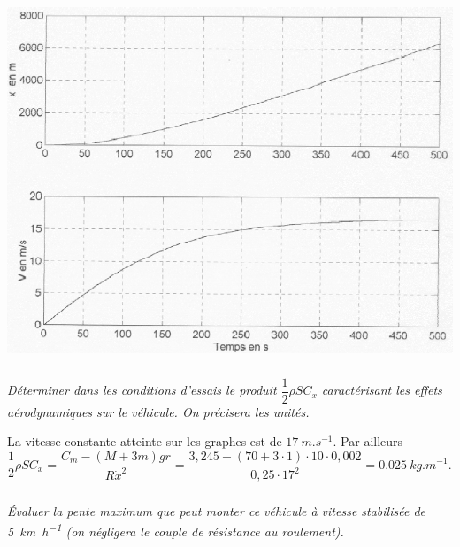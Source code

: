\documentclass[10pt,fleqn]{article} %
\begin{document}
\begin{multicols}{2}
\begin{center}
\includegraphics[width=\linewidth]{images/fig_04}
\end{center}
\fi

\subparagraph{}
\textit{Déterminer dans les conditions d’essais le produit $\dfrac{1}{2}\rho S C_x$ caractérisant les effets aérodynamiques sur le véhicule. On précisera les unités. }
\ifprof
\begin{corrige}
La vitesse constante atteinte sur les graphes est de $\SI{17}{m.s^{-1}}$.  Par ailleurs 
$\dfrac{1}{2}\rho S C_x=\dfrac{C_m-\left(M+3m\right)gr}{R\dot{x}^2} =\dfrac{3,245-\left(70+3\cdot 1\right)\cdot 10 \cdot 0,002}{0,25\cdot 17^2}=\SI{0,025}{kg.m^{-1}}.$
\end{corrige}
\else
\fi


\subparagraph{}
\textit{Évaluer la pente maximum que peut monter ce véhicule à vitesse stabilisée de \SI{5}{km.h^{-1}} (on négligera le couple de résistance au roulement). }
\ifprof

\begin{corrige}
\end{corrige}
\else
\fi




\end{multicols}
\end{document}
